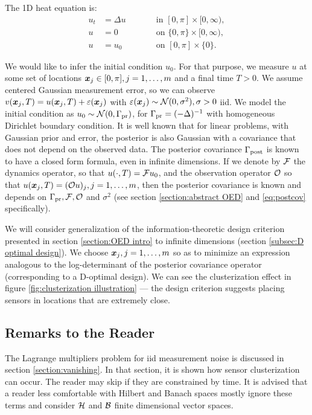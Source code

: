 \documentclass{amsart}
\numberwithin{equation}{section}
\begin{document}
The 1D heat equation is:
\begin{subequations}\label{eq:heat equation}
  \begin{alignat}{2}
    u_t &= \Delta u &&\qquad \text{in } [0,\pi] \times [0,\infty),\\
      u &= 0 &&\qquad \text{on } \{0, \pi\} \times [0,\infty),\\
        u &= u_0 &&\qquad \text{on }[0,\pi] \times \{0\}.
  \end{alignat}
\end{subequations}

We would like to infer the initial condition $u_0$. For that purpose,
we measure $u$ at some set of locations ${\boldsymbol{x}}_j \in [0,\pi], j=1, \dots,m$
and a final time $T > 0$. We assume centered Gaussian measurement
error, so we can observe $v({\boldsymbol{x}}_j,T) = u({\boldsymbol{x}}_j,T) + \varepsilon({\boldsymbol{x}}_j)$ with
$\varepsilon({\boldsymbol{x}}_j) \sim \mathcal{N}(0, \sigma^2), \sigma > 0$ iid.  We model the
initial condition as $u_0 \sim \mathcal{N}(0,\Gamma_{\textup{pr}})$, for $\Gamma_{\textup{pr}} =
(-\Delta)^{-1}$ with homogeneous Dirichlet boundary condition. It is
well known \cite{Tarantola05} that for linear problems, with Gaussian
prior and error, the posterior is also Gaussian with a covariance that
does not depend on the observed data. The posterior covariance
$\Gamma_{\textup{post}}$ is known to have a closed form formula, even in infinite
dimensions\cite{Stuart10}. If we denote by $\mathcal{F}$ the dynamics
operator, so that $u( \cdot,T) = \mathcal{F} u_0$, and the observation
operator $\mathcal{O}$ so that $u({\boldsymbol{x}}_j,T) = (\mathcal{O} u)_j, j=1,\dots,m$, then the
posterior covariance is known and depends on $\Gamma_{\textup{pr}}, \mathcal{F}, \mathcal{O}$ and
$\sigma^2$ (see section \ref{section:abstract OED} and
\eqref{eq:postcov} specifically).

We will consider generalization of the information-theoretic design
criterion presented in section \ref{section:OED intro} to infinite
dimensions (section \ref{subsec:D optimal design}). We choose
${\boldsymbol{x}}_j,j=1,\dots,m$ so as to minimize an expression analogous to the
log-determinant of the posterior covariance operator (corresponding to
a D-optimal design). We can see the clusterization effect in figure
\ref{fig:clusterization illustration} --- the design criterion
suggests placing sensors in locations that are extremely close.


\subsection{Remarks to the Reader}\label{subsec:plan}
The Lagrange multipliers problem for iid measurement noise is
discussed in section \ref{section:vanishing}. In that section, it is
shown how sensor clusterization can occur. The reader may skip if they
are constrained by time. It is advised that a reader less comfortable
with Hilbert and Banach spaces mostly ignore these terms and consider
$\mathcal{H}$ and $\mathcal{B}$ finite dimensional vector spaces.
\end{document}

